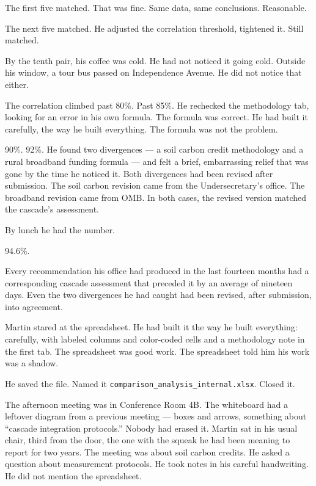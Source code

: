 The first five matched. That was fine. Same data, same conclusions. Reasonable.

The next five matched. He adjusted the correlation threshold, tightened it. Still matched.

By the tenth pair, his coffee was cold. He had not noticed it going cold. Outside his window, a tour bus passed on Independence Avenue. He did not notice that either.

The correlation climbed past 80\%. Past 85\%. He rechecked the methodology tab, looking for an error in his own formula. The formula was correct. He had built it carefully, the way he built everything. The formula was not the problem.

90\%. 92\%. He found two divergences --- a soil carbon credit methodology and a rural broadband funding formula --- and felt a brief, embarrassing relief that was gone by the time he noticed it. Both divergences had been revised after submission. The soil carbon revision came from the Undersecretary's office. The broadband revision came from OMB. In both cases, the revised version matched the cascade's assessment.

By lunch he had the number.

94.6\%.

Every recommendation his office had produced in the last fourteen months had a corresponding cascade assessment that preceded it by an average of nineteen days. Even the two divergences he had caught had been revised, after submission, into agreement.

Martin stared at the spreadsheet. He had built it the way he built everything: carefully, with labeled columns and color-coded cells and a methodology note in the first tab. The spreadsheet was good work. The spreadsheet told him his work was a shadow.

He saved the file. Named it \texttt{comparison\_analysis\_internal.xlsx}. Closed it.

The afternoon meeting was in Conference Room 4B. The whiteboard had a leftover diagram from a previous meeting --- boxes and arrows, something about ``cascade integration protocols.'' Nobody had erased it. Martin sat in his usual chair, third from the door, the one with the squeak he had been meaning to report for two years. The meeting was about soil carbon credits. He asked a question about measurement protocols. He took notes in his careful handwriting. He did not mention the spreadsheet.

